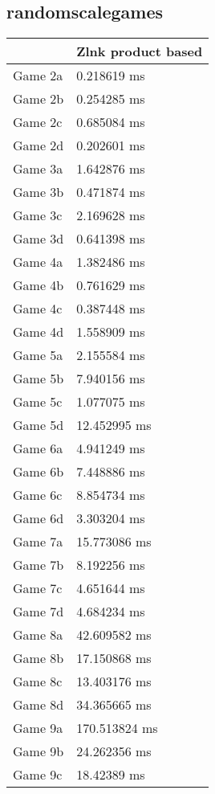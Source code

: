 \subsection{randomscalegames}
\begin{tabular}{|l|l|}
	\hline
	& Zlnk product based \\ \hline
	Game 2a & 0.218619 ms \\ \hline
	Game 2b & 0.254285 ms \\ \hline
	Game 2c & 0.685084 ms \\ \hline
	Game 2d & 0.202601 ms \\ \hline
	Game 3a & 1.642876 ms \\ \hline
	Game 3b & 0.471874 ms \\ \hline
	Game 3c & 2.169628 ms \\ \hline
	Game 3d & 0.641398 ms \\ \hline
	Game 4a & 1.382486 ms \\ \hline
	Game 4b & 0.761629 ms \\ \hline
	Game 4c & 0.387448 ms \\ \hline
	Game 4d & 1.558909 ms \\ \hline
	Game 5a & 2.155584 ms \\ \hline
	Game 5b & 7.940156 ms \\ \hline
	Game 5c & 1.077075 ms \\ \hline
	Game 5d & 12.452995 ms \\ \hline
	Game 6a & 4.941249 ms \\ \hline
	Game 6b & 7.448886 ms \\ \hline
	Game 6c & 8.854734 ms \\ \hline
	Game 6d & 3.303204 ms \\ \hline
	Game 7a & 15.773086 ms \\ \hline
	Game 7b & 8.192256 ms \\ \hline
	Game 7c & 4.651644 ms \\ \hline
	Game 7d & 4.684234 ms \\ \hline
	Game 8a & 42.609582 ms \\ \hline
	Game 8b & 17.150868 ms \\ \hline
	Game 8c & 13.403176 ms \\ \hline
	Game 8d & 34.365665 ms \\ \hline
	Game 9a & 170.513824 ms \\ \hline
	Game 9b & 24.262356 ms \\ \hline
	Game 9c & 18.42389 ms \\ \hline

\end{tabular}
